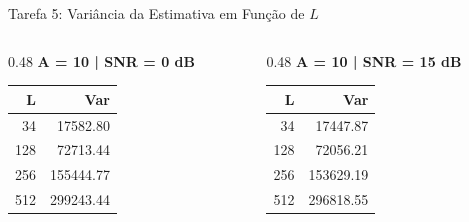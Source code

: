 \documentclass[10pt]{beamer}
\begin{document}
\begin{frame}{Tarefa 5: Variância da Estimativa em Função de $L$}
    \vspace{-0.2cm}
    
    \begin{columns}[t]
        \begin{column}{0.48\textwidth}
            \centering
            \textbf{A = 10 | SNR = 0 dB} \\ \vspace{0.1cm}
            \scriptsize
            \begin{tabular}{rr}
                \toprule
                \textbf{L} & \textbf{Var} \\
                \midrule
                34 & 17582.80 \\
                128 & 72713.44 \\
                256 & 155444.77 \\
                512 & 299243.44 \\
                \bottomrule
            \end{tabular}
        \end{column}
        
        \begin{column}{0.48\textwidth}
            \centering
            \textbf{A = 10 | SNR = 15 dB} \\ \vspace{0.1cm}
            \scriptsize
            \begin{tabular}{rr}
                \toprule
                \textbf{L} & \textbf{Var} \\
                \midrule
                34 & 17447.87 \\
                128 & 72056.21 \\
                256 & 153629.19 \\
                512 & 296818.55 \\
                \bottomrule
            \end{tabular}
        \end{column}
    \end{columns}

    \vspace{0.4cm} %
    

\end{frame}
\end{document}
